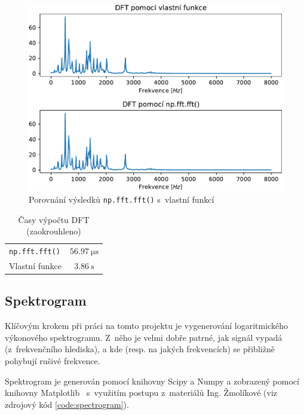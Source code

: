 \documentclass[a4paper, 11pt, final]{article}
\begin{document}
\begin{figure}[ht]
    \centering
    \includegraphics{img/03-dft-module.pdf}
    \caption{Porovnání výsledků \texttt{np.fft.fft()} s~vlastní funkcí\protect\footnotemark}
    \label{fig:dft-graph-comparison}
\end{figure}

\begin{table}[ht]
    \centering
    \begin{tabular}{|l|c|}
        \hline
        \texttt{np.fft.fft()} & $\SI{56.97}{\micro\second}$ \\
        Vlastní funkce & $\SI{3.86}{\second}$ \\
        \hline
    \end{tabular}
    \caption{Časy výpočtu DFT (zaokrouhleno)}
    \label{tab:dft-time-comparison}
\end{table}

\subsection{Spektrogram}

Klíčovým krokem při práci na tomto projektu je vygenerování logaritmického výkonového spektrogramu. Z~něho je velmi dobře patrné, jak signál vypadá (z~frekvenčního hlediska), a kde (resp. na jakých frekvencích) se přibližně pohybují rušivé frekvence.

Spektrogram je generován pomocí knihovny Scipy \cite{scipy-reference} a Numpy \cite{numpy-reference} a zobrazený pomocí knihovny Matplotlib~\cite{matplotlib-reference} s~využitím postupu z~materiálů Ing. Žmolíkové \cite{zmolikova-demo} (viz zdrojový kód \ref{code:spectrogram}).
\end{document}
